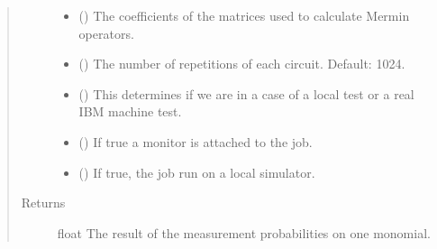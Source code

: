 \documentclass[letterpaper,10pt,english]{sphinxmanual}
\begin{document}
\begin{fulllineitems}
\begin{quote}
\begin{description}
\begin{itemize}
\item {} 
 (\sphinxstyleliteralemphasis{\sphinxupquote{{[}}}\sphinxstyleliteralemphasis{\sphinxupquote{{]}}}) \textendash{} The coefficients of the matrices used to 
calculate Mermin operators.

\item {} 
 () \textendash{} The number of repetitions of each circuit. Default: 1024.

\item {} 
 () \textendash{} This determines if we are in a case of a local
test or a real IBM machine test.

\item {} 
 () \textendash{} If true a monitor is attached to the job.

\item {} 
 () \textendash{} If true, the job run on a local simulator.

\end{itemize}

\item[{Returns}] \leavevmode
float \textendash{} The result of the measurement probabilities on one 
monomial.

\end{description}\end{quote}

\end{fulllineitems}

\end{document}
